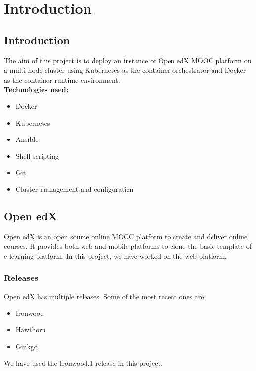 \documentclass[12pt]{report}
\begin{document}
\chapter{Introduction}
\section{Introduction}

The aim of this project is to deploy an instance of Open edX MOOC platform on a multi-node cluster using Kubernetes as the container orchestrator and Docker as the container runtime environment. \\

\textbf{Technologies used:}
\begin{itemize}
	\item Docker
	\item Kubernetes
	\item Ansible
	\item Shell scripting
	\item Git
	\item Cluster management and configuration
\end{itemize}



\section{Open edX}
Open edX is an open source online MOOC platform to create and deliver online courses. It provides both web and mobile platforms to clone the basic template of e-learning platform. In this project, we have worked on the web platform.

\subsection{Releases}
Open edX has multiple releases. Some of the most recent ones are:
\begin{itemize}
	\item Ironwood
	\item Hawthorn
	\item Ginkgo
\end{itemize}
We have used the Ironwood.1 release in this project.
\end{document}
